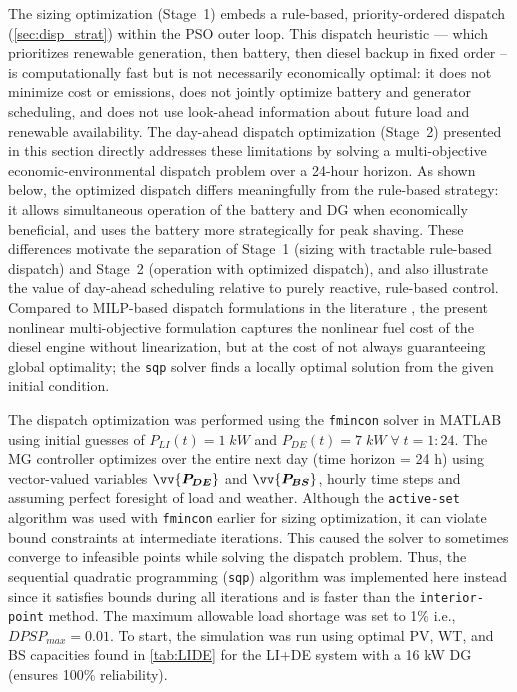 \documentclass[final,3p,times]{elsarticle}
\begin{document}
The sizing optimization (Stage~1) embeds a rule-based, priority-ordered dispatch (\cref{sec:disp_strat}) within the PSO outer loop. This dispatch heuristic --- which prioritizes renewable generation, then battery, then diesel backup in fixed order -- is computationally fast but is not necessarily economically optimal: it does not minimize cost or emissions, does not jointly optimize battery and generator scheduling, and does not use look-ahead information about future load and renewable availability. The day-ahead dispatch optimization (Stage~2) presented in this section directly addresses these limitations by solving a multi-objective economic-environmental dispatch problem over a 24-hour horizon. As shown below, the optimized dispatch differs meaningfully from the rule-based strategy: it allows simultaneous operation of the battery and DG when economically beneficial, and uses the battery more strategically for peak shaving. These differences motivate the separation of Stage~1 (sizing with tractable rule-based dispatch) and Stage~2 (operation with optimized dispatch), and also illustrate the value of day-ahead scheduling relative to purely reactive, rule-based control. Compared to MILP-based dispatch formulations in the literature \cite{parisio2014, dercam}, the present nonlinear multi-objective formulation captures the nonlinear fuel cost of the diesel engine without linearization, but at the cost of not always guaranteeing global optimality; the \texttt{sqp} solver finds a locally optimal solution from the given initial condition.

The dispatch optimization was performed using the \texttt{fmincon} solver in MATLAB using initial guesses of $P_{LI}(t) = 1 \; kW$ and $P_{DE}(t) = 7 \; kW \; \forall \; t = 1:24$. The MG controller optimizes over the entire next day (time horizon = 24 h) using vector-valued variables $\vv{\bm{P_{DE}}}$ and $\vv{\bm{P_{BS}}}$, hourly time steps and assuming perfect foresight of load and weather. Although the \texttt{active-set} algorithm was used with \texttt{fmincon} earlier for sizing optimization, it can violate bound constraints at intermediate iterations. This caused the solver to sometimes converge to infeasible points while solving the dispatch problem. Thus, the sequential quadratic programming (\texttt{sqp}) algorithm was implemented here instead since it satisfies bounds during all iterations and is faster than the \texttt{interior-point} method. The maximum allowable load shortage was set to 1\% i.e., $DPSP_{max} = 0.01$. To start, the simulation was run using optimal PV, WT, and BS capacities found in \cref{tab:LIDE} for the LI+DE system with a 16 kW DG (ensures 100\% reliability).   
\end{document}
